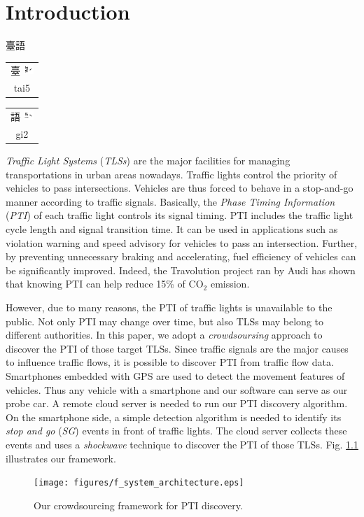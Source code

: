 \documentclass[final,oneside,onecolumn,12pt,a4paper]{book}%
\makeatletter
\newcommand{\rubybot}[2]{%
  \@tempdimc \f@size\p@
  \begin{tabular}[t]{@{}c@{}}
    #1\\[-3em]
    \fontsize{.8\@tempdimc}{.8\@tempdimc}\selectfont%
    \setlength{\normalbaselineskip}{0pt}#2 
  \end{tabular}%
}
\makeatother
\begin{document}
\frontmatter
\newpage{} \newpage{} \newpage{}
\tableofcontents
\listoffigures
\listoftables



\mainmatter


\chapter{Introduction}

臺語
\rubybot{臺 \includegraphics[height=1em]{圖/⿳⿳ㄉㄞˊ}}{tai5}
\rubybot{語 \includegraphics[height=1em]{圖/⿳⿳ㆣㄧˋ}}{gi2}

\emph{Traffic Light Systems} (\emph{TLSs}) are the major facilities for
managing transportations in urban areas nowadays. Traffic lights control the
priority of vehicles to pass intersections. Vehicles are thus forced to behave
in a stop-and-go manner according to traffic signals. Basically, the
\emph{Phase Timing Information} (\emph{PTI}) of each traffic light controls
its signal timing. PTI includes the traffic light cycle length and signal
transition time. It can be used in applications such as violation warning and
speed advisory for vehicles to pass an intersection. Further, by preventing
unnecessary braking and accelerating, fuel efficiency of vehicles can be
significantly improved. Indeed, the Travolution project \cite{Audio2011} ran
by Audi has shown that knowing PTI can help reduce 15\% of CO$_{\text{2}}$ emission.

However, due to many reasons, the PTI of traffic lights is unavailable to the
public. Not only PTI may change over time, but also TLSs may belong to
different authorities. In this paper, we adopt a \emph{crowdsoursing} approach
to discover the PTI of those target TLSs. Since traffic signals are the major
causes to influence traffic flows, it is possible to discover PTI from traffic
flow data. Smartphones embedded with GPS are used to detect the movement
features of vehicles. Thus any vehicle with a smartphone and our software can
serve as our probe car.
A remote cloud server is needed to run our PTI discovery algorithm. On the
smartphone side, a simple detection algorithm is needed to identify its
\emph{stop and go} (\emph{SG}) events in front of traffic lights. The cloud
server collects these events and uses a \emph{shockwave} technique
to discover the PTI of those TLSs.
Fig. \ref{fig:f_system_architecture} illustrates our
framework.\begin{figure}[pth]
\centerline{\texttt{[image: figures/f\_system\_architecture.eps]}} \hfill\caption{Our crowdsourcing
framework for PTI discovery.}%
\label{fig:f_system_architecture}%
\end{figure}
\end{document}

